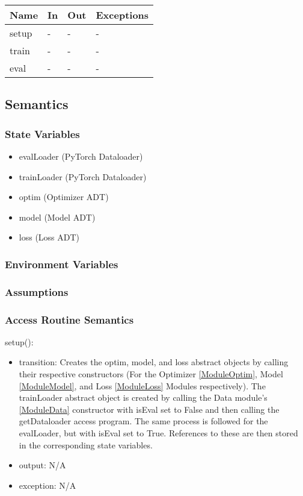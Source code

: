 \documentclass[12pt, titlepage]{article}
\begin{document}
\begin{center}
\begin{tabular}{p{2cm}|p{6cm}|p{2cm}|p{2cm}}
\hline
\textbf{Name} & \textbf{In} & \textbf{Out} & \textbf{Exceptions} \\
\hline
setup & - & - & - \\
\hline
train & - & - & - \\
\hline
eval & - & - & - \\
\hline
\end{tabular}
\end{center}

\subsection{Semantics}

\subsubsection{State Variables}
\begin{itemize}
  \item evalLoader (PyTorch Dataloader)
  \item trainLoader (PyTorch Dataloader)
  \item optim (Optimizer ADT)
  \item model (Model ADT)
  \item loss (Loss ADT)
\end{itemize}

\subsubsection{Environment Variables}


\subsubsection{Assumptions}


\subsubsection{Access Routine Semantics}

\noindent setup():
\begin{itemize}
\item transition: Creates the optim, model, and loss abstract objects by calling their respective constructors (For the Optimizer \ref{ModuleOptim}, Model \ref{ModuleModel}, and Loss \ref{ModuleLoss} Modules respectively). The trainLoader abstract object is created by calling the Data module's \ref{ModuleData} constructor with isEval set to False and then calling the getDataloader access program. The same process is followed for the evalLoader, but with isEval set to True. References to these are then stored in the corresponding state variables.
\item output: N/A
\item exception: N/A
\end{itemize}
\end{document}
